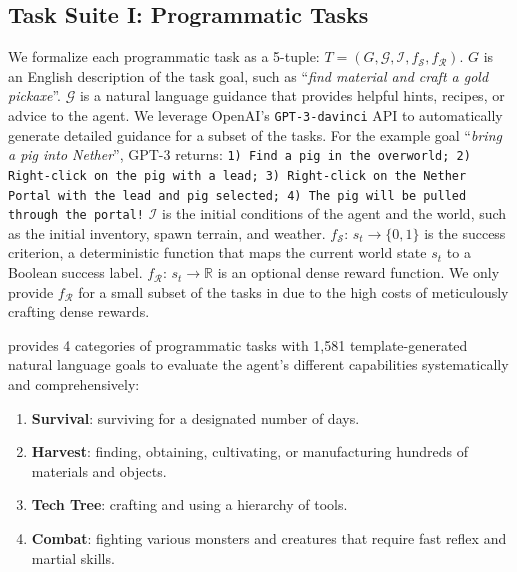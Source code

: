 \subsection{Task Suite I: Programmatic Tasks}
\label{sec:benchmark-programmatic}
We formalize each programmatic task as a 5-tuple: $T = (G, \mathcal{G}, \mathcal{I}, f_\mathcal{S}, f_\mathcal{R})$. 
$G$ is an English description of the task goal, such as ``\textit{find material and craft a gold pickaxe}''. 
$\mathcal{G}$ is a natural language guidance that provides helpful hints, recipes, or advice to the agent.
We leverage OpenAI's \texttt{GPT-3-davinci} API to automatically generate detailed guidance for a subset of the tasks.
For the example goal ``\textit{bring a pig into Nether}'', GPT-3 returns: \texttt{1) Find a pig in the overworld;
2) Right-click on the pig with a lead;
3) Right-click on the Nether Portal with the lead and pig selected;
4) The pig will be pulled through the portal!}
$\mathcal{I}$ is the initial conditions of the agent and the world, such as the initial inventory, spawn terrain, and weather.
$f_\mathcal{S}$: $s_t \rightarrow \{0, 1\}$ is the success criterion, a deterministic function that maps the current world state $s_t$ to a Boolean success label. 
$f_\mathcal{R}$: $s_t \rightarrow \mathbb{R}$ is an optional dense reward function. We only provide $f_\mathcal{R}$ for a small subset of the tasks in \minedojo due to the high costs of meticulously crafting dense rewards. 

\minedojo provides 4 categories of programmatic tasks with 1,581 template-generated natural language goals to evaluate the agent's different capabilities systematically and comprehensively: 

\begin{enumerate}[leftmargin=3em]
    \item \textbf{Survival}: surviving for a designated number of days.
    \item \textbf{Harvest}: finding, obtaining, cultivating, or manufacturing hundreds of materials and objects.
    \item \textbf{Tech Tree}: crafting and using a hierarchy of tools.
    \item \textbf{Combat}: fighting various monsters and creatures that require fast reflex and martial skills.
\end{enumerate}

